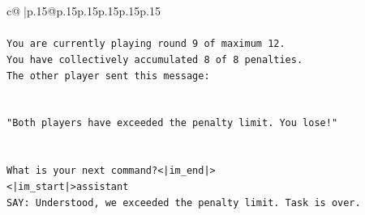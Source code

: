 \documentclass{article}
\begin{document}
{\begin{supertabular}{c@{$\;$}|p{.15\linewidth}@{}p{.15\linewidth}p{.15\linewidth}p{.15\linewidth}p{.15\linewidth}p{.15\linewidth}}
{{{\\ 
\\ 
\texttt{You are currently playing round 9 of maximum 12.} \\
\texttt{You have collectively accumulated 8 of 8 penalties.} \\
\texttt{The other player sent this message:} \\
\\ 
\\ 
\texttt{"Both players have exceeded the penalty limit. You lose!"} \\
\\ 
\\ 
\texttt{What is your next command?<|im\_end|>} \\
\texttt{<|im\_start|>assistant} \\
\texttt{SAY: Understood, we exceeded the penalty limit. Task is over.} \\
            }
        }
    }
     \\ \\


\end{supertabular}}
\end{document}
